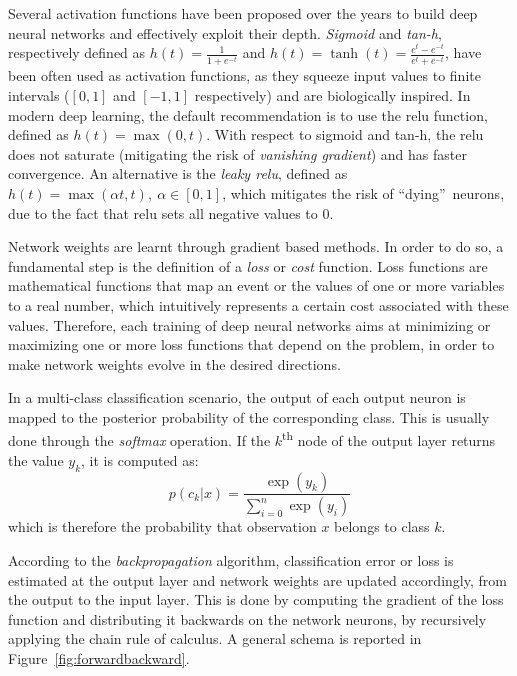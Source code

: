 \documentclass[%
    corpo=12pt,
    twoside,
    stile=classica,   
    tipotesi=magistrale,
    evenboxes,
    english,
	numerazioneromana,
]{toptesi}
\begin{document}
\bigskip
Several activation functions have been proposed over the years to build deep neural networks and effectively exploit their depth. \textit{Sigmoid} and \textit{tan-h}, respectively defined as $h(t) = \frac{1}{1 + e^{-t}}$ and $h(t) = \tanh(t) = \frac{e^t - e^{-t}}{e^t + e^{-t}}$, have been often used as activation functions, as they squeeze input values to finite intervals ($[0,1]$ and $[-1,1]$ respectively) and are biologically inspired. In modern deep learning, the default recommendation is to use the \gls{relu} function, defined as $h(t) = \max(0,t)$. With respect to sigmoid and tan-h, the \gls{relu} does not saturate (mitigating the risk of \textit{vanishing gradient}) and has faster convergence. An alternative is the \textit{leaky \gls{relu}}, defined as $h(t) = \max(\alpha t, t),\ \alpha \in [0,1]$, which mitigates the risk of \textquotedblleft dying\textquotedblright~neurons, due to the fact that \gls{relu} sets all negative values to $0$.

\bigskip
Network weights are learnt through gradient based methods. In order to do so, a fundamental step is the definition of a \textit{loss} or \textit{cost} function. Loss functions are mathematical functions that map an event or the values of one or more variables to a real number, which intuitively represents a certain cost associated with these values. Therefore, each training of deep neural networks aims at minimizing or maximizing one or more loss functions that depend on the problem, in order to make network weights evolve in the desired directions. 

\medskip
In a multi-class classification scenario, the output of each output neuron is mapped to the posterior probability of the corresponding class. This is usually done through the \textit{softmax} operation. If the $k$\textsuperscript{th} node of the output layer returns the value $y_k$, it is computed as:
\begin{equation*}
	p(c_k|x) = \frac{\exp{(y_k)}}{\sum_{i=0}^n \exp{(y_i)}}
\end{equation*}
which is therefore the probability that observation $x$ belongs to class $k$.

\medskip
According to the \textit{backpropagation} algorithm, classification error or loss is estimated at the output layer and network weights are updated accordingly, from the output to the input layer. This is done by computing the gradient of the loss function and distributing it backwards on the network neurons, by recursively applying the chain rule of calculus\cite{goodfellow2016deep}. A general schema is reported in Figure~\ref{fig:forwardbackward}.
\end{document}
